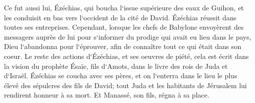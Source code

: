 \verse Ce fut aussi lui, Ézéchias, qui boucha l`issue supérieure des eaux de Guihon, et les conduisit en bas vers l`occident de la cité de David. Ézéchias réussit dans toutes ses entreprises. 
\verse Cependant, lorsque les chefs de Babylone envoyèrent des messagers auprès de lui pour s`informer du prodige qui avait eu lieu dans le pays, Dieu l`abandonna pour l`éprouver, afin de connaître tout ce qui était dans son coeur. 
\verse Le reste des actions d`Ézéchias, et ses oeuvres de piété, cela est écrit dans la vision du prophète Ésaïe, fils d`Amots, dans le livre des rois de Juda et d`Israël. 
\verse Ézéchias se coucha avec ses pères, et on l`enterra dans le lieu le plus élevé des sépulcres des fils de David; tout Juda et les habitants de Jérusalem lui rendirent honneur à sa mort. Et Manassé, son fils, régna à sa place. 

